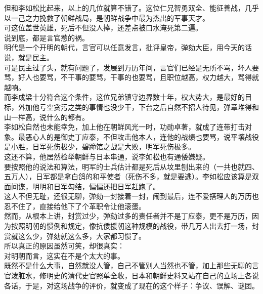 \begin{multicols}{\theparacolNo}
但和李如松比起来，以上的几位就算不错了。这位仁兄智勇双全、能征善战，几乎以一己之力挽救了朝鲜战局，是朝鲜战争中最为杰出的军事天才。\\

可这位盖世英雄，死后不但没人捧，还差点被口水淹死第二遍。\\

说到底，都是言官惹的祸。\\

明代是一个开明的朝代，言官可以任意发言，批评皇帝，弹劾大臣，用今天的话说，就是民主。\\

可是民主过了头，就有问题了，发展到万历年间，言官们已经是无所不骂，坏人要骂，好人也要骂，不干事的要骂，干事的也要骂，且职位越高，权力越大，骂得就越响。\\

而李成梁十分符合这个条件，这位兄弟镇守边界数十年，权大势大，是最好的目标，外加他亏空贪污之类的事情也没少干，下台之后自然不招人待见，弹章堆得和山一样高，说什么的都有。\\

李如松自然也未能幸免，加上他在朝鲜风光一时，功勋卓著，就成了连带打击对象。最恶心人的是御史丁应泰，不但攻击他本人，连他的战绩也要骂，说平壤战役是小胜，日军死伤极少，碧蹄馆之战是大败，明军死伤极多。\\

这还不算，他居然检举朝鲜与日本串通，说李如松也有通倭嫌疑。\\

要按照他的说法和算法，明军的士兵估计都是死后从坟里刨出来的（一共也就四、五万人），日军都是拿白鸽的和平使者（死伤不多，就是要逃）。李如松应该算是双面间谍，明明和日军勾结，偏偏还把日军赶跑了。\\

这人不但无耻，还很无聊，弹劾一封接着一封，闹到最后，连不爱搭理人的万历也忍不住了，直接给他下了个革职令让他滚蛋。\\

然而，从根本上讲，封赏过少，弹劾过多的责任者并不是丁应泰，更不是万历，因为按照明朝的惯例和规定，像抗倭援朝这种规模的战役，带几万人出去打一场，封赏就这么少，弹劾就这么多，大家都习惯了。\\

所以真正的原因虽然可笑，却很真实：\\

对明朝而言，这实在不是个太大的事。\\

既然不是什么大事，自然就没人管，自己不管别人当然也不管，加上那些无聊的言官泼脏水，修明史的清代史官照单全收，日本和朝鲜史料又站在自己的立场上各说各话，于是，对这场战争的评价，就变成了现在的这个样子：争议、误解、谜团。\\


\end{multicols}
